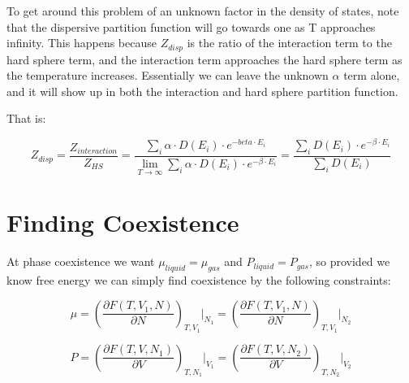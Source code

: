 To get around this problem of an unknown factor in the density of states, note that the dispersive partition function will go towards one as T approaches infinity. This happens because $Z_{disp}$ is the ratio of the interaction term to the hard sphere term, and the interaction term approaches the hard sphere term as the temperature increases. Essentially we can leave the unknown $\alpha$ term alone, and it will show up in both the interaction and hard sphere partition function.

That is:

\begin{equation}\label{eq:MCDISP8}
Z_{disp}=\frac{Z_{interaction}}{Z_{HS}}=\frac{\sum_i \alpha\cdot D(E_i)\cdot e^{-beta\cdot E_i}}{\lim_{T\to\infty}\sum_i \alpha\cdot D(E_i)\cdot e^{-\beta\cdot E_i}}=\frac{\sum_i D(E_i)\cdot e^{-\beta\cdot E_i}}{\sum_i D(E_i)}
\end{equation}
\section{Finding Coexistence}
At phase coexistence we want $\mu_{liquid}=\mu_{gas}$ and $P_{liquid}=P_{gas}$, so provided we know free energy we can simply find coexistence by the following constraints:

\begin{equation}\label{eq:methodsMu}
\mu=\left(\frac{\partial F(T,V_1,N)}{\partial N}\right)_{T,V_1}\Bigg|_{N_1}=\left(\frac{\partial F(T,V_1,N)}{\partial N}\right)_{T,V_1}\Bigg|_{N_2}
\end{equation}

\begin{equation}\label{eq:methodsP}
P=\left(\frac{\partial F(T,V,N_1)}{\partial V}\right)_{T,N_1}\Bigr|_{V_1}=\left(\frac{\partial F(T,V,N_2)}{\partial V}\right)_{T,N_2}\Bigr|_{V_2}
\end{equation}


